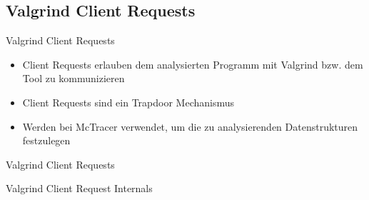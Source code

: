 \subsection{Valgrind Client Requests}

\begin{frame}{Valgrind Client Requests}
	\begin{itemize}
		\item Client Requests erlauben dem analysierten Programm mit Valgrind bzw. dem Tool zu kommunizieren
		\pause \item Client Requests sind ein Trapdoor Mechanismus
		\pause \item Werden bei McTracer verwendet, um die zu analysierenden Datenstrukturen festzulegen
	\end{itemize}

	\pause

	\lstset{frame=single}
	
\end{frame}

\begin{frame}{Valgrind Client Requests}
	\lstset{frame=single}
		
\end{frame}

\begin{frame}{Valgrind Client Request Internals}
	\lstset{frame=single}
		
\end{frame}

